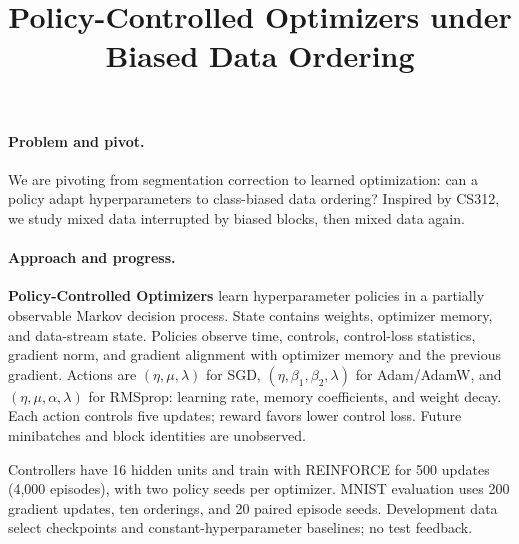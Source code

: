 \documentclass[twoside,11pt]{article}
\begin{document}
\title{Policy-Controlled Optimizers under Biased Data Ordering}
\renewcommand{\authorlist}{\normalsize\makebox[0pt][l]{\textbf{Nick Rui, Sandra Yang, and Aidan Whitedeer}}\\[3pt]
\small Status Update Draft --- November 13, 2026}
\renewcommand{\emaillist}{}
\maketitle

\paragraph{Problem and pivot.}
We are pivoting from segmentation correction to learned optimization: can a policy adapt hyperparameters to class-biased data ordering? Inspired by CS312, we study mixed data interrupted by biased blocks, then mixed data again.

\paragraph{Approach and progress.}
\textbf{Policy-Controlled Optimizers} learn hyperparameter policies in a partially observable Markov decision process. State contains weights, optimizer memory, and data-stream state. Policies observe time, controls, control-loss statistics, gradient norm, and gradient alignment with optimizer memory and the previous gradient. Actions are $(\eta,\mu,\lambda)$ for SGD, $(\eta,\beta_1,\beta_2,\lambda)$ for Adam/AdamW, and $(\eta,\mu,\alpha,\lambda)$ for RMSprop: learning rate, memory coefficients, and weight decay. Each action controls five updates; reward favors lower control loss. Future minibatches and block identities are unobserved.

Controllers have 16 hidden units and train with REINFORCE for 500 updates (4,000 episodes), with two policy seeds per optimizer. MNIST evaluation uses 200 gradient updates, ten orderings, and 20 paired episode seeds. Development data select checkpoints and constant-hyperparameter baselines; no test feedback.
\end{document}
